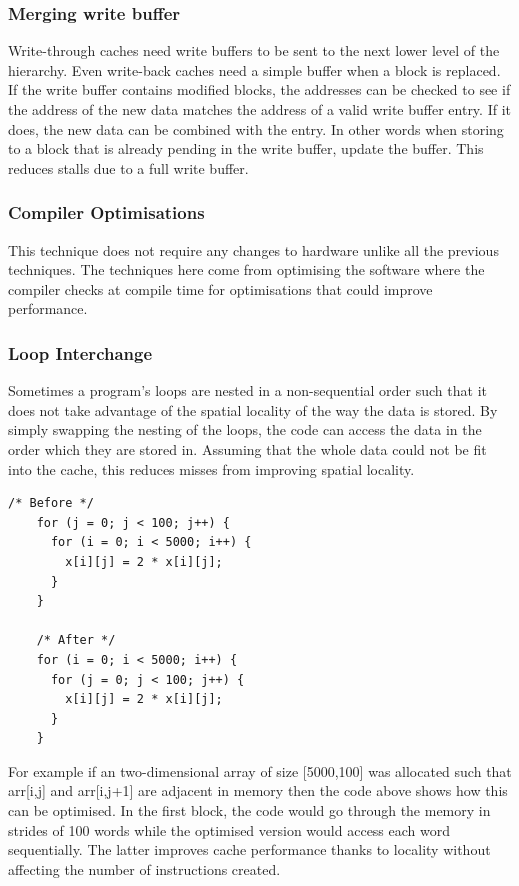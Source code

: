 \documentclass[11pt]{article}
\begin{document}
\subsubsection{Merging write buffer}
Write-through caches need write buffers to be sent to the next lower level of the hierarchy. Even write-back caches need a simple buffer when a block is replaced. If the write buffer contains modified blocks, the addresses can be checked to see if the address of the new data matches the address of a valid write buffer entry. If it does, the new data can be combined with the entry. In other words when storing to a block that is already pending in the write buffer, update the buffer.
\n 
This reduces stalls due to a full write buffer.

\subsubsection{Compiler Optimisations}
This technique does not require any changes to hardware unlike all the previous techniques. The techniques here come from optimising the software where the compiler checks at compile time for optimisations that could improve performance. 

\subsubsection*{Loop Interchange}
Sometimes a program's loops are nested in a non-sequential order such that it does not take advantage of the spatial locality of the way the data is stored. By simply swapping the nesting of the loops, the code can access the data in the order which they are stored in. Assuming that the whole data could not be fit into the cache, this reduces misses from improving spatial locality.
\begin{center}
  \begin{lstlisting}[caption={Loop interchange}, captionpos=b]
    /* Before */
    for (j = 0; j < 100; j++) {
      for (i = 0; i < 5000; i++) {
        x[i][j] = 2 * x[i][j];
      }
    }

    /* After */
    for (i = 0; i < 5000; i++) {
      for (j = 0; j < 100; j++) {
        x[i][j] = 2 * x[i][j];
      }
    }
  \end{lstlisting}
\end{center}
For example if an two-dimensional array of size [5000,100] was allocated such that arr[i,j] and arr[i,j+1] are adjacent in memory then the code above shows how this can be optimised. In the first block, the code would go through the memory in strides of 100 words while the optimised version would access each word sequentially. The latter improves cache performance thanks to locality without affecting the number of instructions created.
\end{document}
